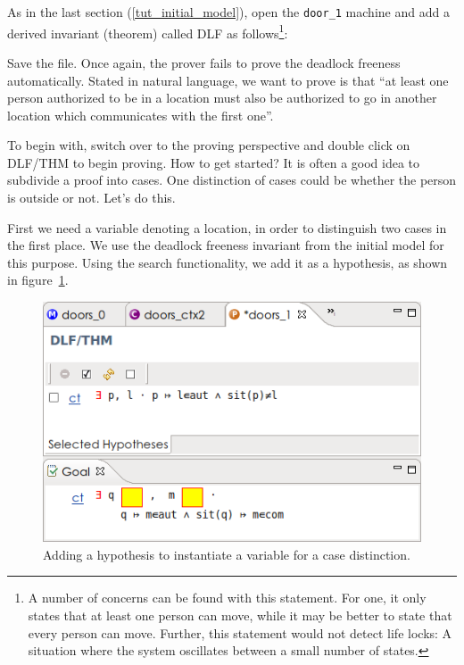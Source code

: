 
As in the last section (\ref{tut_initial_model}), open the \texttt{door\_1} machine and add a derived invariant (theorem) called \textsf{DLF} as follows\footnote{A number of concerns can be found with this statement.  For one, it only states that at least one person can move, while it may be better to state that every person can move.  Further, this statement would not detect life locks: A situation where the system oscillates between a small number of states.}: 


Save the file. Once again, the prover fails to prove the deadlock freeness automatically. Stated in natural language, we want to prove is that ``at least one person authorized to be in a location must also be authorized to go in another location which communicates with the first one''.

To begin with, switch over to the proving perspective and double click on \textsf{DLF/THM} to begin proving.  How to get started?  It is often a good idea to subdivide a proof into cases.  One distinction of cases could be whether the person is outside or not.  Let's do this.

First we need a variable denoting a location, in order to distinguish two cases in the first place.  We use the deadlock freeness invariant from the initial model for this purpose.  Using the search functionality, we add it as a hypothesis, as shown in figure~\ref{tut_10_ref_proof1}.

\begin{figure}[!ht]
\begin{center}
	\includegraphics[]{img/tutorial/tut_10_ref_proof1.png}
	\caption{Adding a hypothesis to instantiate a variable for a case distinction.}
	\label{tut_10_ref_proof1}
\end{center}
\end{figure}

